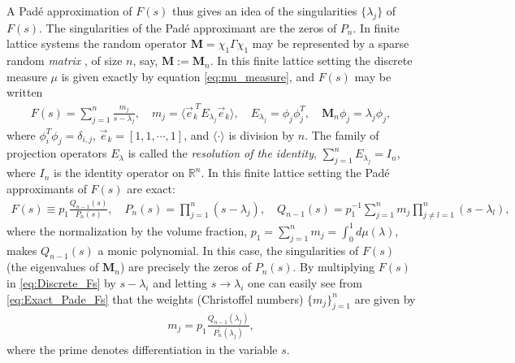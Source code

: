 \documentclass[english,12pt]{ttuthes}
\begin{document}
A Pad\'{e} approximation of $F(s)$ thus gives an idea of the
singularities $\{\lambda_j\}$ of $F(s)$. The singularities of the Pad\'{e}
approximant are the zeros of $P_n$. In finite lattice systems the random
operator $\mathbf{M}=\chi_1\Gamma\chi_1$ may be represented by a sparse random
\emph{matrix} \cite{Golden:CMP-467}, of size $n$, say,
$\mathbf{M}:=\mathbf{M}_n$. In this finite lattice setting the discrete
measure $\mu$ is given exactly by equation \eqref{eq:mu_measure}, and
$F(s)$ may be written \cite{Golden:CMP-467}   
%
\begin{align}\label{eq:Discrete_Fs}
  F(s)=\sum_{j=1}^{n}\frac{m_j}{s-\lambda_j}, \quad
  m_j=\langle\vec{e}_k^{\;T}E_{\lambda_j}\vec{e}_k\rangle,\quad
  E_{\lambda_j}=\phi_j\phi_j^T, \quad \mathbf{M}_n\phi_j=\lambda_j\phi_j,
\end{align}
%
where $\phi_i^T\phi_j=\delta_{i,j}$, $\vec{e}_k=[1,1,\cdots,1]$, and $\langle\cdot\rangle$ is division
by $n$. The family of projection operators $E_{\lambda}$ is called the
\emph{resolution of the identity}, $\sum_{j=1}^nE_{\lambda_j}=I_n$, where $I_n$
is the identity operator on $\mathbb{R}^n$. In this finite lattice
setting the Pad\'{e} approximants of $F(s)$ are exact:        
%
\begin{align}\label{eq:Exact_Pade_Fs}
  F(s)\equiv p_1\frac{Q_{n-1}(s)}{P_n(s)},\quad
  P_n(s)=\prod_{j=1}^n(s-\lambda_j), \quad Q_{n-1}(s)=p_1^{-1}\sum_{j=1}^nm_j\prod_{j\neq l=1}^n(s-\lambda_l),
\end{align}
%
where the normalization by the volume fraction, $p_1=\sum_{j=1}^nm_j=\int_0^1d\mu(\lambda)$, makes
$Q_{n-1}(s)$ a monic polynomial. In this case, the singularities of
$F(s)$ (the eigenvalues of $\mathbf{M}_n$) are precisely the
zeros of $P_n(s)$. By multiplying
$F(s)$ in \eqref{eq:Discrete_Fs} by $s-\lambda_i$ and letting $s\to\lambda_i$
one can easily see from \eqref{eq:Exact_Pade_Fs} that the weights
(Christoffel numbers) $\{m_j\}_{j=1}^n$ are given by \cite{Assche:JCAM:1991:237}
%
\begin{align}\label{eq:Christoffel_nums_QP}
  m_j=p_1\frac{Q_{n-1}(\lambda_j)}{P_n^\prime(\lambda_j)},
\end{align}
where the prime denotes differentiation in the variable $s$. 
\end{document}
